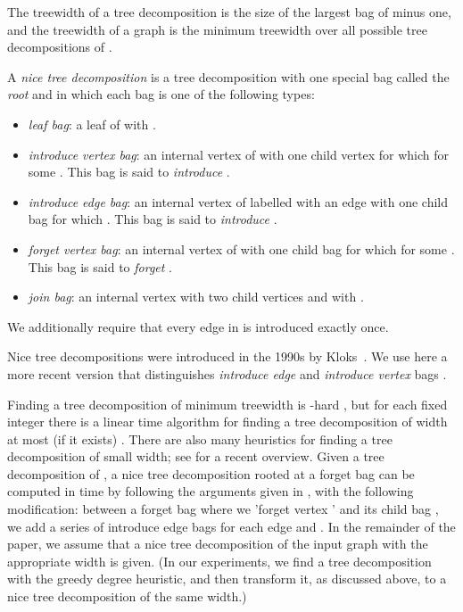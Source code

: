 \documentclass{llncs}
\begin{document}
The treewidth  of a tree decomposition  is the size of the largest bag of  minus one, and the treewidth of a graph  is the minimum treewidth over all possible tree decompositions of .
\begin{definition}\label{ntd} A \emph{nice tree decomposition}  is a tree decomposition with one special bag  called the \emph{root} and in which each bag is one of the following types:
\begin{itemize}
\item \emph{leaf bag}: a leaf  of  with .
\item \emph{introduce vertex bag}: an internal vertex  of  with one child vertex  for which  for some . This bag is said to \emph{introduce} .
\item \emph{introduce edge bag}: an internal vertex  of  labelled with an edge  with one child bag  for which . This bag is said to \emph{introduce} .
\item \emph{forget vertex bag}: an internal vertex  of  with one child bag  for which  for some . This bag is said to \emph{forget} .
\item \emph{join bag}: an internal vertex  with two child vertices  and  with .
\end{itemize}
We additionally require that every edge in  is introduced exactly once.
\end{definition}

Nice tree decompositions were introduced in the 1990s by Kloks~\cite{Kloks93}. We use here a more
recent version that distinguishes {\em introduce edge} and {\em introduce vertex} bags \cite{CyganNPPRW11}.

Finding a tree decomposition of minimum treewidth is -hard \cite{ArnborgCP87},
but for each fixed integer  there is a linear time algorithm for finding a tree decomposition of width at most  (if it exists) \cite{Bodlaender96}.
There are also many heuristics for finding a tree decomposition of small width; see \cite{BodlaenderK10} for
a recent overview.
Given a tree decomposition  of , a nice tree decomposition rooted at a forget bag can be 
computed in  time by following the arguments given in \cite{Kloks93}, with the
following modification: between a forget bag  where we 'forget vertex '  and its child bag , we add a series of introduce edge bags for each edge 
and .
In the remainder of the paper, we assume that a nice tree decomposition of the input graph with the appropriate width is given.
(In our experiments, we find a tree decomposition with the greedy degree heuristic, and then transform it, as discussed above, to a nice
tree decomposition of the same width.)
\end{document}

